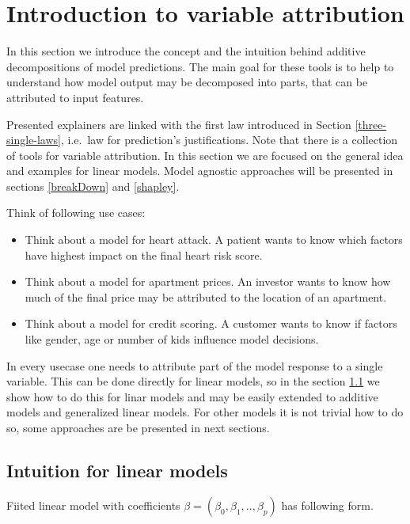 \documentclass[]{krantz}
\providecommand{\tightlist}{%
  \setlength{\itemsep}{0pt}\setlength{\parskip}{0pt}}
\theoremstyle{definition}
\theoremstyle{definition}
\theoremstyle{definition}
\theoremstyle{remark}
\begin{document}
\hypertarget{variableAttributionMethods}{%
\section{Introduction to variable
attribution}\label{variableAttributionMethods}}

In this section we introduce the concept and the intuition behind
additive decompositions of model predictions. The main goal for these
tools is to help to understand how model output may be decomposed into
parts, that can be attributed to input features.

Presented explainers are linked with the first law introduced in Section
\ref{three-single-laws}, i.e.~law for prediction's justifications. Note
that there is a collection of tools for variable attribution. In this
section we are focused on the general idea and examples for linear
models. Model agnostic approaches will be presented in sections
\ref{breakDown} and \ref{shapley}.

Think of following use cases:

\begin{itemize}
\tightlist
\item
  Think about a model for heart attack. A patient wants to know which
  factors have highest impact on the final heart risk score.
\item
  Think about a model for apartment prices. An investor wants to know
  how much of the final price may be attributed to the location of an
  apartment.
\item
  Think about a model for credit scoring. A customer wants to know if
  factors like gender, age or number of kids influence model decisions.
\end{itemize}

In every usecase one needs to attribute part of the model response to a
single variable. This can be done directly for linear models, so in the
section \ref{VAlinMod} we show how to do this for linar models and may
be easily extended to additive models and generalized linear models. For
other models it is not trivial how to do so, some approaches are be
presented in next sections.

\hypertarget{VAlinMod}{%
\subsection{Intuition for linear models}\label{VAlinMod}}

Fiited linear model with coefficients
\(\beta = (\beta_0, \beta_1, .., \beta_p)\) has following form.
\end{document}
